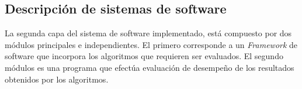 \subsection{Descripción de sistemas de software}
La segunda capa del sistema de software implementado, está compuesto por dos módulos principales e independientes. El primero corresponde a un \textit{Framework} de software que incorpora los algoritmos que requieren ser evaluados. El segundo módulos es una programa que efectúa evaluación de desempeño de los resultados obtenidos por los algoritmos. 
